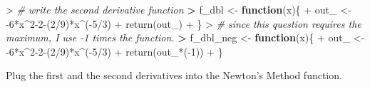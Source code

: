 \documentclass[
]{article}
\newenvironment{Shaded}{\begin{snugshade}}{\end{snugshade}}
\newcommand{\CommentTok}[1]{\textcolor[rgb]{0.56,0.35,0.01}{\textit{#1}}}
\newcommand{\ControlFlowTok}[1]{\textcolor[rgb]{0.13,0.29,0.53}{\textbf{#1}}}
\newcommand{\DecValTok}[1]{\textcolor[rgb]{0.00,0.00,0.81}{#1}}
\newcommand{\ErrorTok}[1]{\textcolor[rgb]{0.64,0.00,0.00}{\textbf{#1}}}
\newcommand{\FunctionTok}[1]{\textcolor[rgb]{0.00,0.00,0.00}{#1}}
\newcommand{\NormalTok}[1]{#1}
\newcommand{\OtherTok}[1]{\textcolor[rgb]{0.56,0.35,0.01}{#1}}
\newcommand{\SpecialCharTok}[1]{\textcolor[rgb]{0.00,0.00,0.00}{#1}}
\begin{document}
\begin{Shaded}
\begin{Highlighting}[]
\SpecialCharTok{\textgreater{}} \CommentTok{\# write the second derivative function}
\ErrorTok{\textgreater{}}\NormalTok{ f\_dbl }\OtherTok{\textless{}{-}} \ControlFlowTok{function}\NormalTok{(x)\{}
\SpecialCharTok{+}\NormalTok{   out\_ }\OtherTok{\textless{}{-}} \SpecialCharTok{{-}}\DecValTok{6}\SpecialCharTok{*}\NormalTok{x}\SpecialCharTok{\^{}}\DecValTok{2{-}2}\SpecialCharTok{{-}}\NormalTok{(}\DecValTok{2}\SpecialCharTok{/}\DecValTok{9}\NormalTok{)}\SpecialCharTok{*}\NormalTok{x}\SpecialCharTok{\^{}}\NormalTok{(}\SpecialCharTok{{-}}\DecValTok{5}\SpecialCharTok{/}\DecValTok{3}\NormalTok{)}
\SpecialCharTok{+}   \FunctionTok{return}\NormalTok{(out\_)}
\SpecialCharTok{+}\NormalTok{ \}}
\SpecialCharTok{\textgreater{}} \CommentTok{\# since this question requires the maximum, I use {-}1 times the function.}
\ErrorTok{\textgreater{}}\NormalTok{ f\_dbl\_neg }\OtherTok{\textless{}{-}} \ControlFlowTok{function}\NormalTok{(x)\{}
\SpecialCharTok{+}\NormalTok{   out\_ }\OtherTok{\textless{}{-}} \SpecialCharTok{{-}}\DecValTok{6}\SpecialCharTok{*}\NormalTok{x}\SpecialCharTok{\^{}}\DecValTok{2{-}2}\SpecialCharTok{{-}}\NormalTok{(}\DecValTok{2}\SpecialCharTok{/}\DecValTok{9}\NormalTok{)}\SpecialCharTok{*}\NormalTok{x}\SpecialCharTok{\^{}}\NormalTok{(}\SpecialCharTok{{-}}\DecValTok{5}\SpecialCharTok{/}\DecValTok{3}\NormalTok{)}
\SpecialCharTok{+}   \FunctionTok{return}\NormalTok{(out\_}\SpecialCharTok{*}\NormalTok{(}\SpecialCharTok{{-}}\DecValTok{1}\NormalTok{))}
\SpecialCharTok{+}\NormalTok{ \}}
\end{Highlighting}
\end{Shaded}

Plug the first and the second derivatives into the Newton's Method
function.
\end{document}
